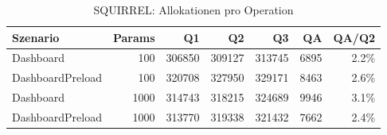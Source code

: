 \begin{table}[ht]
\centering
\caption{SQUIRREL: Allokationen pro Operation}
\begin{tabular}{lrrrrrr}
\toprule
Szenario & Params & Q1 & Q2 & Q3 & QA & QA/Q2 \\
\midrule
		Dashboard & 100 & 306850 & 309127 & 313745 & 6895 & 2.2\% \\
		DashboardPreload & 100 & 320708 & 327950 & 329171 & 8463 & 2.6\% \\
		Dashboard & 1000 & 314743 & 318215 & 324689 & 9946 & 3.1\% \\
		DashboardPreload & 1000 & 313770 & 319338 & 321432 & 7662 & 2.4\% \\
\bottomrule
\end{tabular}
\label{tab:benchmark_squirrel_allocsperop}
\end{table}
	